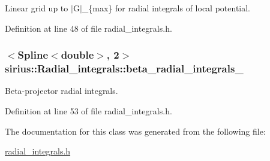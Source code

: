 Linear grid up to $\vert$\+G$\vert$\+\_\+\{max\} for radial integrals of local potential. 



Definition at line 48 of file radial\+\_\+integrals.\+h.

\hypertarget{classsirius_1_1_radial__integrals_addcbf237e71e82add5251cc5ad4061a2}{}
\subsubsection[{beta\+\_\+radial\+\_\+integrals\+\_\+}]{$<${\bf Spline}$<$double$>$, 2$>$ sirius\+::\+Radial\+\_\+integrals\+::beta\+\_\+radial\+\_\+integrals\+\_\+\hspace{0.3cm}{\ttfamily [private]}}\label{classsirius_1_1_radial__integrals_addcbf237e71e82add5251cc5ad4061a2}


Beta-\/projector radial integrals. 



Definition at line 53 of file radial\+\_\+integrals.\+h.



The documentation for this class was generated from the following file\+:\begin{DoxyCompactItemize}
\item 
\hyperlink{radial__integrals_8h}{radial\+\_\+integrals.\+h}\end{DoxyCompactItemize}
